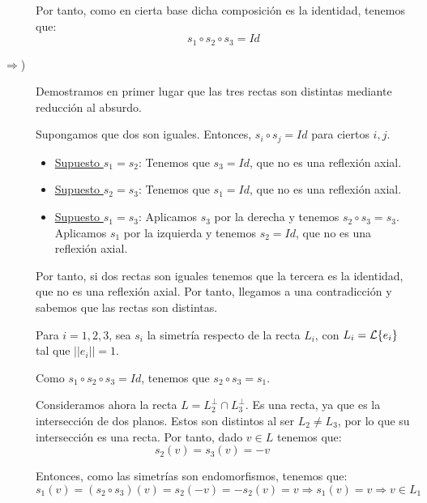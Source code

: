 \begin{ejercicio}
\begin{description}
        Por tanto, como en cierta base dicha composición es la identidad, tenemos que:
        \begin{equation*}
            s_1\circ s_2 \circ s_3 = Id
        \end{equation*}

        \item [$\Longrightarrow$)]

        Demostramos en primer lugar que las tres rectas son distintas mediante reducción al absurdo.

        Supongamos que dos son iguales. Entonces, $s_i\circ s_j=Id$ para ciertos $i,j$.
        \begin{itemize}
            \item \underline{Supuesto $s_1=s_2$}: Tenemos que $s_3=Id$, que no es una reflexión axial.

            \item \underline{Supuesto $s_2=s_3$}: Tenemos que $s_1=Id$, que no es una reflexión axial.

            \item \underline{Supuesto $s_1=s_3$}: Aplicamos $s_3$ por la derecha y tenemos $s_2\circ s_3 = s_3$. Aplicamos $s_1$ por la izquierda y tenemos $s_2 = Id$, que no es una reflexión axial. 
        \end{itemize}
        Por tanto, si dos rectas son iguales tenemos que la tercera es la identidad, que no es una reflexión axial. Por tanto, llegamos a una contradicción y sabemos que las rectas son distintas.

        Para $i=1,2,3$, sea $s_i$ la simetría respecto de la recta $L_i$, con $L_i=\mathcal{L}\{e_i\}$ tal que $||e_i||=1$.

        Como $s_1\circ s_2\circ s_3 = Id$, tenemos que $s_2\circ s_3 = s_1$.

        Consideramos ahora la recta $L=L_2^\perp \cap L_3^\perp$. Es una recta, ya que es la intersección de dos planos. Estos son distintos al ser $L_2\neq L_3$, por lo que su intersección es una recta. Por tanto, dado $v\in L$ tenemos que:
        \begin{equation*}
            s_2(v)=s_3(v)=-v \qquad 
        \end{equation*}

        Entonces, como las simetrías son endomorfismos, tenemos que:
        \begin{equation*}
            s_1(v) = (s_2\circ s_3)(v) = s_2(-v) = -s_2(v) = v \Longrightarrow s_1(v)=v \Longrightarrow v\in L_1
        \end{equation*}


\end{description}
\end{ejercicio}
